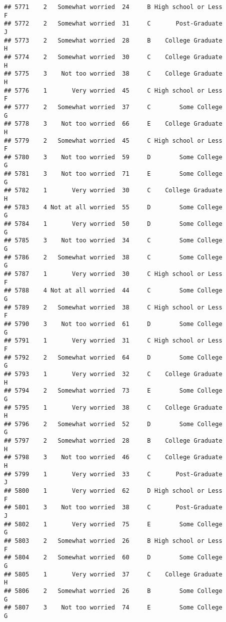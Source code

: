 \documentclass[
]{article}
\begin{document}
\begin{verbatim}
## 5771    2   Somewhat worried  24     B High school or Less         F
## 5772    2   Somewhat worried  31     C       Post-Graduate         J
## 5773    2   Somewhat worried  28     B    College Graduate         H
## 5774    2   Somewhat worried  30     C    College Graduate         H
## 5775    3    Not too worried  38     C    College Graduate         H
## 5776    1       Very worried  45     C High school or Less         F
## 5777    2   Somewhat worried  37     C        Some College         G
## 5778    3    Not too worried  66     E    College Graduate         H
## 5779    2   Somewhat worried  45     C High school or Less         F
## 5780    3    Not too worried  59     D        Some College         G
## 5781    3    Not too worried  71     E        Some College         G
## 5782    1       Very worried  30     C    College Graduate         H
## 5783    4 Not at all worried  55     D        Some College         G
## 5784    1       Very worried  50     D        Some College         G
## 5785    3    Not too worried  34     C        Some College         G
## 5786    2   Somewhat worried  38     C        Some College         G
## 5787    1       Very worried  30     C High school or Less         F
## 5788    4 Not at all worried  44     C        Some College         G
## 5789    2   Somewhat worried  38     C High school or Less         F
## 5790    3    Not too worried  61     D        Some College         G
## 5791    1       Very worried  31     C High school or Less         F
## 5792    2   Somewhat worried  64     D        Some College         G
## 5793    1       Very worried  32     C    College Graduate         H
## 5794    2   Somewhat worried  73     E        Some College         G
## 5795    1       Very worried  38     C    College Graduate         H
## 5796    2   Somewhat worried  52     D        Some College         G
## 5797    2   Somewhat worried  28     B    College Graduate         H
## 5798    3    Not too worried  46     C    College Graduate         H
## 5799    1       Very worried  33     C       Post-Graduate         J
## 5800    1       Very worried  62     D High school or Less         F
## 5801    3    Not too worried  38     C       Post-Graduate         J
## 5802    1       Very worried  75     E        Some College         G
## 5803    2   Somewhat worried  26     B High school or Less         F
## 5804    2   Somewhat worried  60     D        Some College         G
## 5805    1       Very worried  37     C    College Graduate         H
## 5806    2   Somewhat worried  26     B        Some College         G
## 5807    3    Not too worried  74     E        Some College         G

\end{verbatim}
\end{document}
